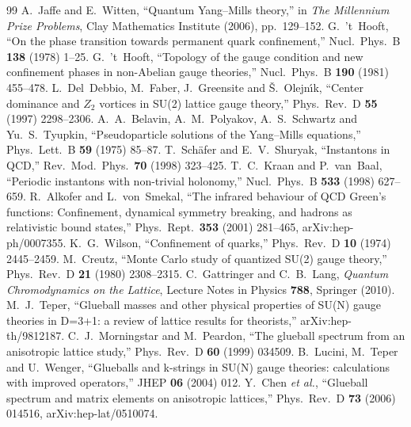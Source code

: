 \documentclass[11pt,a4paper]{article}
\theoremstyle{definition}
\theoremstyle{remark}
\begin{document}
\begin{thebibliography}{99}\small
{} A.~Jaffe and E.~Witten, ``Quantum Yang--Mills theory,'' in \emph{The Millennium Prize Problems}, Clay Mathematics Institute (2006), pp.~129--152.
 G.~'t~Hooft, ``On the phase transition towards permanent quark confinement,'' Nucl.\ Phys.\ B \textbf{138} (1978) 1--25.
 G.~'t~Hooft, ``Topology of the gauge condition and new confinement phases in non-Abelian gauge theories,'' Nucl.\ Phys.\ B \textbf{190} (1981) 455--478.
 L.~Del~Debbio, M.~Faber, J.~Greensite and \v{S}.~Olejn\'{\i}k, ``Center dominance and $Z_2$ vortices in SU(2) lattice gauge theory,'' Phys.\ Rev.\ D \textbf{55} (1997) 2298--2306.
 A.~A.~Belavin, A.~M.~Polyakov, A.~S.~Schwartz and Yu.~S.~Tyupkin, ``Pseudoparticle solutions of the Yang--Mills equations,'' Phys.\ Lett.\ B \textbf{59} (1975) 85--87.
 T.~Sch\"afer and E.~V.~Shuryak, ``Instantons in QCD,'' Rev.\ Mod.\ Phys.\ \textbf{70} (1998) 323--425.
 T.~C.~Kraan and P.~van~Baal, ``Periodic instantons with non-trivial holonomy,'' Nucl.\ Phys.\ B \textbf{533} (1998) 627--659.
 R.~Alkofer and L.~von~Smekal, ``The infrared behaviour of QCD Green's functions: Confinement, dynamical symmetry breaking, and hadrons as relativistic bound states,'' Phys.\ Rept.\ \textbf{353} (2001) 281--465, arXiv:hep-ph/0007355.
 K.~G.~Wilson, ``Confinement of quarks,'' Phys.\ Rev.\ D \textbf{10} (1974) 2445--2459.
 M.~Creutz, ``Monte Carlo study of quantized SU(2) gauge theory,'' Phys.\ Rev.\ D \textbf{21} (1980) 2308--2315.
 C.~Gattringer and C.~B.~Lang, \emph{Quantum Chromodynamics on the Lattice}, Lecture Notes in Physics \textbf{788}, Springer (2010).
 M.~J.~Teper, ``Glueball masses and other physical properties of SU(N) gauge theories in D=3+1: a review of lattice results for theorists,'' arXiv:hep-th/9812187.
 C.~J.~Morningstar and M.~Peardon, ``The glueball spectrum from an anisotropic lattice study,'' Phys.\ Rev.\ D \textbf{60} (1999) 034509.
 B.~Lucini, M.~Teper and U.~Wenger, ``Glueballs and k-strings in SU(N) gauge theories: calculations with improved operators,'' JHEP \textbf{06} (2004) 012.
 Y.~Chen \emph{et al.}, ``Glueball spectrum and matrix elements on anisotropic lattices,'' Phys.\ Rev.\ D \textbf{73} (2006) 014516, arXiv:hep-lat/0510074.

\end{thebibliography}
\end{document}
